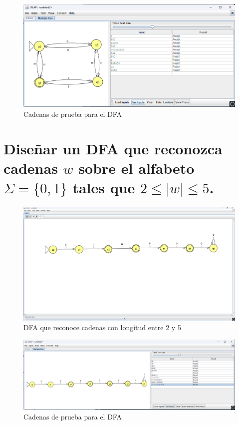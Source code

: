 \documentclass[11pt]{report}
\begin{document}
\begin{figure}[H]
  \centering
  \includegraphics[scale=0.65]{img/DFA_04_test.png}
  \caption{Cadenas de prueba para el DFA}
\end{figure}

\newpage

\section{Diseñar un DFA que reconozca cadenas $w$ sobre el alfabeto $\Sigma = \{0, 1\}$ tales que $2\leq |w| \leq 5$.}
\begin{figure}[H]
  \centering
  \includegraphics[scale=0.34]{img/DFA_05.png}
  \caption{DFA que reconoce cadenas con longitud entre 2 y 5}
\end{figure}

\begin{figure}[H]
  \centering
  \includegraphics[scale=0.45]{img/DFA_05_test.png}
  \caption{Cadenas de prueba para el DFA}
\end{figure}
\end{document}
